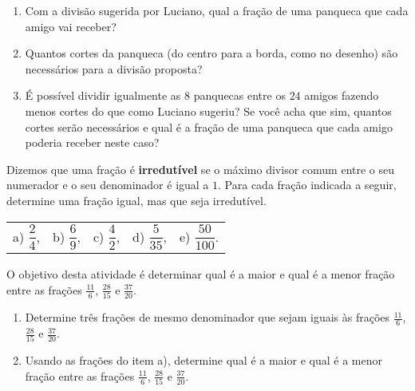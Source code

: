 \begin{atividade}{}
\begin{center}
\end{center}

\begin{enumerate} [\quad a)] %
  \item     Com a divisão sugerida por Luciano, qual a fração de uma panqueca que cada amigo vai receber?
  \item     Quantos cortes da panqueca (do centro para a borda, como no desenho) são necessários para a divisão proposta?
  \item     É possível dividir igualmente as     $8$ panquecas entre os     $24$ amigos fazendo menos cortes do que como Luciano sugeriu? Se você acha que sim, quantos cortes serão necessários e qual é a fração de uma panqueca que cada amigo poderia receber neste caso?
\end{enumerate} %
\end{atividade}

\begin{atividade}{}

Dizemos que uma fração é {\bf irredutível} se o máximo divisor comum entre o seu numerador e o seu denominador é igual a $1$. Para cada fração indicada a seguir, determine uma fração igual, mas que seja irredutível.
\vspace{.2cm}

\begin{tabular}{m{}m{}m{}m{}m{}}
a) $\dfrac{2}{4}$, & b) $\dfrac{6}{9}$, & c) $\dfrac{4}{2}$, & d) $\dfrac{5}{35}$, & e) $\dfrac{50}{100}$.
\end{tabular}
\end{atividade}

\begin{atividade}{}

O objetivo desta atividade é determinar qual é a maior e qual é a menor fração entre
as frações $\frac{11}{6}$, $\frac{28}{15}$ e $\frac{37}{20}$.

\begin{enumerate} [\quad a)] %
  \item     Determine três frações de mesmo denominador que sejam iguais às frações     $\frac{11}{6}$,     $\frac{28}{15}$ e     $\frac{37}{20}$.
  \item     Usando as frações do item a), determine qual é a maior e qual é a menor fração entre as frações     $\frac{11}{6}$,     $\frac{28}{15}$ e     $\frac{37}{20}$.
\end{enumerate} %
\end{atividade}

